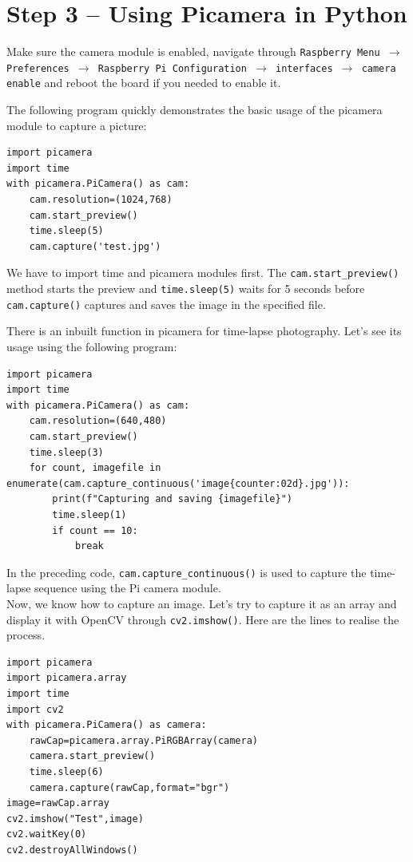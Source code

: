 \documentclass{labo}
\begin{document}
\section*{Step 3 – Using Picamera in Python}
Make sure the camera module is enabled, navigate through \texttt{Raspberry Menu $\rightarrow$ Preferences $\rightarrow$ Raspberry Pi Configuration $\rightarrow$ interfaces $\rightarrow$ camera enable} and reboot the board if you needed to enable it.

The following program quickly demonstrates the basic usage of the picamera module to capture a picture:
\begin{verbatim}
import picamera
import time
with picamera.PiCamera() as cam:
	cam.resolution=(1024,768)
	cam.start_preview()
	time.sleep(5)
	cam.capture('test.jpg')
\end{verbatim}
We have to import time and picamera modules first. The \texttt{cam.start\_preview()} method starts the preview and \texttt{time.sleep(5)} waits for 5 seconds before \texttt{cam.capture()} captures and saves the image in the specified file.

There is an inbuilt function in picamera for time-lapse photography. Let's see its usage using the following program:

\begin{verbatim}
import picamera
import time
with picamera.PiCamera() as cam:
	cam.resolution=(640,480)
	cam.start_preview()
	time.sleep(3)
	for count, imagefile in enumerate(cam.capture_continuous('image{counter:02d}.jpg')):
		print(f"Capturing and saving {imagefile}")
		time.sleep(1)
		if count == 10:
			break
\end{verbatim}
In the preceding code, \texttt{cam.capture\_continuous()} is used to capture the time-lapse sequence using the Pi camera module.\\

Now, we know how to capture an image. Let’s try to capture it as an array and display it with OpenCV through \texttt{cv2.imshow()}. Here are the lines to realise the process.

\begin{verbatim}
import picamera
import picamera.array
import time
import cv2
with picamera.PiCamera() as camera:
	rawCap=picamera.array.PiRGBArray(camera)
	camera.start_preview()
	time.sleep(6)
	camera.capture(rawCap,format="bgr")
image=rawCap.array
cv2.imshow("Test",image)
cv2.waitKey(0)
cv2.destroyAllWindows()
\end{verbatim}
\end{document}
